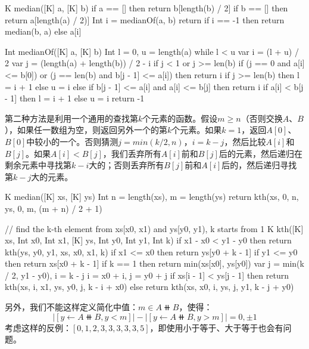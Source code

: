 \documentclass[b5paper]{ctexart}
\begin{document}
\begin{Answer}[ref = {ex:binary-search}]
{\begin{Bourbaki}
K median([K] a, [K] b) {
    if a == [] then return b[length(b) / 2]
    if b == [] then return a[length(a) / 2)]
    Int i = medianOf(a, b)
    return if i == -1 then return median(b, a) else a[i]
}

Int medianOf([K] a, [K] b) {
    Int l = 0, u = length(a)
    while l < u {
        var i = (l + u) / 2
        var j = (length(a) + length(b)) / 2  - i
        if j < 1 or j >= len(b) {
            if (j == 0 and a[i] <= b[0]) or
               (j == len(b) and b[j - 1] <= a[i]) then return i
            if j >= len(b) then l = i + 1 else u = i
        } else {
            if b[j - 1]  <= a[i] and a[i] <= b[j] then return i
            if a[i] < b[j - 1] then l = i + 1 else u = i
        }
    }
    return -1
}
\end{Bourbaki}

第二种方法是利用一个通用的查找第$k$个元素的函数。假设$m \geq n$（否则交换$A$、$B$），如果任一数组为空，则返回另外一个的第$k$个元素。如果$k = 1$，返回$A[0]$、$B[0]$中较小的一个。否则猜测$j = min(k/2, n)$，$i = k - j$，然后比较$A[i]$和$B[j]$。如果$A[i] < B[j]$，我们丢弃所有$A[i]$前和$B[j]$后的元素，然后递归在剩余元素中寻找第$k-i$大的；否则丢弃所有$B[j]$前和$A[i]$后的，然后递归寻找第$k-j$大的元素。

\begin{Bourbaki}
K median([K] xs, [K] ys) {
    Int n = length(xs), m = length(ys)
    return kth(xs, 0, n, ys, 0, m, (m + n) / 2 + 1)
}

// find the k-th element from xs[x0, x1) and ys[y0, y1), k starts from 1
K kth([K] xs, Int x0, Int x1, [K] ys, Int y0, Int y1, Int k) {
    if x1 - x0 < y1 - y0 then return kth(ys, y0, y1, xs, x0, x1, k)
    if x1 <= x0 then return ys[y0 + k - 1]
    if y1 <= y0 then return xs[x0 + k - 1]
    if k == 1 then return min(xs[x0], ys[y0])
    var j = min(k / 2, y1 - y0), i = k - j
    i = x0 + i, j = y0 + j
    if xs[i - 1] < ys[j - 1] then
        return kth(xs, i, x1, ys, y0, j, k - i + x0)
    else
        return kth(xs, x0, i, ys, j, y1, k - j + y0)
}
\end{Bourbaki}

另外，我们不能这样定义简化中值：$m \in A \doubleplus B$，使得：
\[
|[y \gets A \doubleplus B, y < m]| - |[y \gets A \doubleplus B, y > m]| = 0, \pm 1
\]
考虑这样的反例：$[0, 1, 2, 3, 3, 3, 3, 3, 5]$，即使用小于等于、大于等于也会有问题。
}



\end{Answer}
\end{document}
